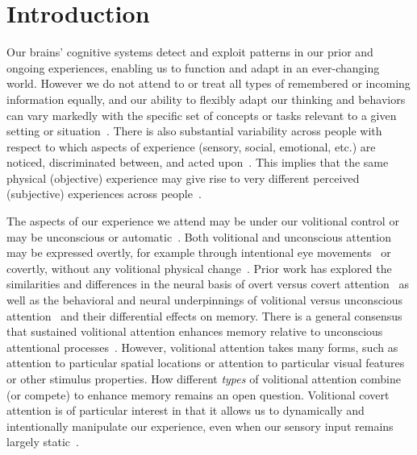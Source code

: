 \documentclass[english]{article}
\begin{document}
\section*{Introduction} 

Our brains' cognitive systems detect and exploit patterns in our prior and
ongoing experiences, enabling us to function and adapt in an ever-changing
world. However we do not attend to or treat all types of remembered or incoming
information equally, and our ability to flexibly adapt our thinking and
behaviors can vary markedly with the specific set of concepts or tasks relevant
to a given setting or situation~\citep{ChunTurk07, AlyTurk17, HardNade09,
RangRitc12, JayaEtal23, HirsAly22, deBeEtal21, KeenEtal22, HakiEtal20,
AdamdeBe19}. There is also substantial variability across people with respect
to which aspects of experience (sensory, social, emotional, etc.) are noticed,
discriminated between, and acted upon~\citep{HuntEtal89}. This implies that the
same physical (objective) experience may give rise to very different perceived
(subjective) experiences across people~\citep{FreeSimo11, ChanEtal21a}.

The aspects of our experience we attend may be under our volitional control or
may be unconscious or automatic~\citep{JacoEtal92}. Both volitional and
unconscious attention may be expressed overtly, for example through intentional
eye movements~\citep{HoffSubr95} or covertly, without any volitional physical
change~\citep{EngbKlie03}. Prior work has explored the similarities and
differences in the neural basis of overt versus covert
attention~\citep{PosnEtal87, HuntKing03} as well as the behavioral and neural
underpinnings of volitional versus unconscious attention~\citep{DijkAart10} and
their differential effects on memory. There is a general consensus that
sustained volitional attention enhances memory relative to unconscious
attentional processes~\citep{UncaEtal11, TurkEtal13}. However, volitional
attention takes many forms, such as attention to particular spatial locations
or attention to particular visual features or other stimulus properties. How
different \textit{types} of volitional attention combine (or compete) to
enhance memory remains an open question. Volitional covert attention is of
particular interest in that it allows us to dynamically and intentionally
manipulate our experience, even when our sensory input remains largely
static~\citep[i.e., constant physical stimulus, retinal image, etc.;][]{YiEtal06,
OcraEtal99}.
\end{document}
